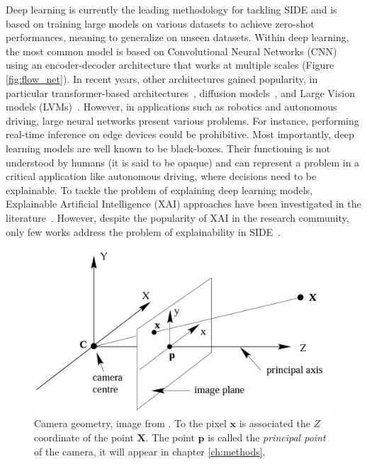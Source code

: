 Deep learning is currently the leading methodology for tackling SIDE and is based on training large models on various datasets to achieve zero-shot performances, meaning to generalize on unseen datasets.
Within deep learning, the most common model is based on Convolutional Neural Networks (CNN) using an encoder-decoder architecture that works at multiple scales (Figure \ref{fig:flow_net}).
In recent years, other architectures gained popularity, in particular transformer-based architectures~\cite{denseViT, PatchFusion}, diffusion models~\cite{Marigold}, and Large Vision models (LVMs)~\cite{Marigold}.
However, in applications such as robotics and autonomous driving, large neural networks present various problems.
For instance, performing real-time inference on edge devices could be prohibitive.
Most importantly, deep learning models are well known to be black-boxes.
Their functioning is not understood by humans (it is said to be opaque) and can represent a problem in a critical application like autonomous driving, where decisions need to be explainable.
To tackle the problem of explaining deep learning models, Explainable Artificial Intelligence (XAI) approaches have been investigated in the literature~\cite{XAI_review}.
However, despite the popularity of XAI in the research community, only few works address the problem of explainability in SIDE~\cite{Hu, Dijk, towards_interpretable}.

\begin{figure}
    \centering
    \includegraphics[scale=0.3]{figs/coordinates}
    \caption[Camera geometry.]{
        Camera geometry, image from \cite{multiview}.
        To the pixel $\mathbf{x}$ is associated the $Z$ coordinate of the point $\mathbf{X}$.
        The point $\mathbf{p}$ is called the \textit{principal point} of the camera, it will appear in chapter \ref{ch:methods}.
        \label{fig:coordinates}
    }
\end{figure}

